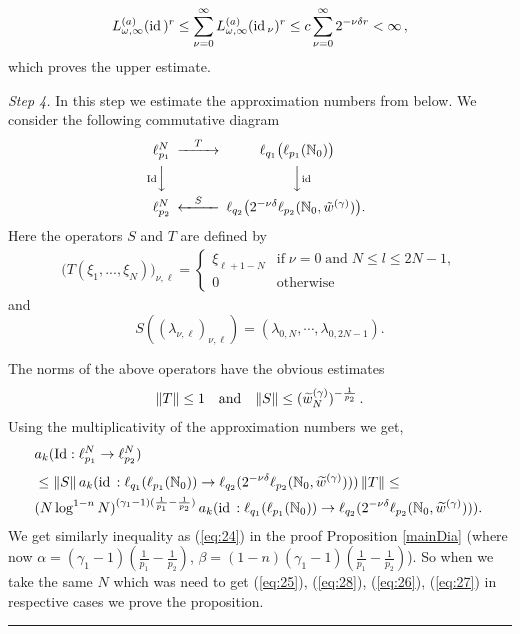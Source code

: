 \documentclass[12pt]{article}
\def\id{\mathop{\rm id \,}\nolimits}
\def\Id{\mathop{\rm Id}\nolimits}
\newcommand{\epr}{\hspace*{\fill}\rule{3mm}{3mm}\\}
\newcommand{\N}{{\mathbb N}}
\begin{document}
$$
L_{\omega,\infty}^{(a)}(\id)^r \leq  \sum_{\nu=0}^\infty
L_{\omega,\infty}^{(a)}(\id_\nu)^r \leq c \sum_{\nu=0}^\infty 2^{-\nu \delta r} < \infty \, , 
$$
which proves the upper estimate.

{\em Step 4.}  In this step we  estimate the approximation numbers from below. We consider  the following commutative diagram
\begin{equation}\nonumber
	\begin{CD}
		\ell_{p_1}^{N}@>{T}>>\ell_{q_1}\big(\ell_{p_1}(\N_0)\big)\\
		@V{\Id}VV@VV{\id}V\\
		\ell_{p_2}^{N} @<{S}<<\ell_{q_2}\big(2^{-\nu\delta}\ell_{p_2}(\N_0, \tilde{w}^{(\gamma)})\big).\,
	\end{CD}
\end{equation}
Here the operators $S$ and $T$ are defined by  
\begin{align*}
	\big(T(\xi_1, ... , \xi_N)\big)_{\nu,\ell} = 
	\begin{cases} 
		\xi_{\ell + 1-N}  & \text{if}\;  \nu=0 \;\text{and}\; N \leq l \leq 2N-1,\\
		0  &\text{otherwise} 
	\end{cases}
\end{align*}
and
$$
S((\lambda_{\nu,\ell})_{\nu,\ell} ) = (\lambda_{0,N}, \cdots ,\lambda_{0,2N-1}). 
$$

The norms of the above operators have the obvious estimates 
$$
\|T\| \leq 1    \quad {\rm and } \quad   \|S\| \leq (\widetilde{w}^{(\gamma)}_N)^{-\frac{1}{p_2}} \, .
$$
Using the multiplicativity of the approximation numbers
we get,   
\begin{align*}
	&   a_k(\Id: \ell_{p_1}^N \rightarrow \ell_{p_2}^N) \nonumber \\[0.1cm]
	& \leq \|S\|  \,a_k(\id: \ell_{q_1}(\ell_{p_1}(\N_0)) \rightarrow      \nonumber
	\ell_{q_2}(2^{-\nu \delta}\ell_{p_2}(\N_0, \widetilde{w}^{(\gamma)}))) \,\|T\| \le \\
	& (N\log^{1-n} N)^{(\gamma_1-1)(\frac{1}{p_1}-\frac{1}{p_2})}\,a_k(\id: \ell_{q_1}(\ell_{p_1}(\N_0)) \rightarrow      \nonumber
	\ell_{q_2}(2^{-\nu \delta}\ell_{p_2}(\N_0, \widetilde{w}^{(\gamma)}))).\,  
\end{align*}
We get similarly inequality as (\ref{eq:24}) in the proof Proposition \ref{mainDia}  (where now $\alpha=(\gamma_1-1)(\frac{1}{p_1}-\frac{1}{p_2})$, $\beta=(1-n)(\gamma_1-1)(\frac{1}{p_1}-\frac{1}{p_2})$). So when we take the same $N$ which was need to get (\ref{eq:25}), (\ref{eq:28}), (\ref{eq:26}), (\ref{eq:27}) in respective cases we prove the proposition.
\epr
\end{document}
